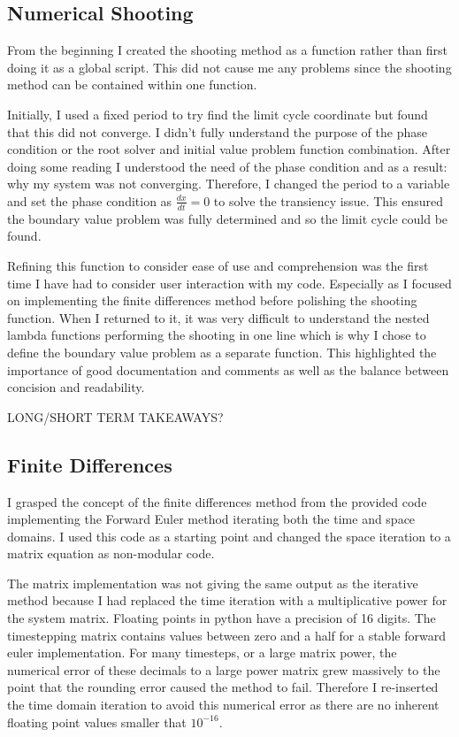\documentclass[10pt]{article}
\begin{document}
\begin{multicols}{2}
\subsection{Numerical Shooting}
From the beginning I created the shooting method as a function rather than first doing it as a global script. This did not cause me any problems since the shooting method can be contained within one function. 

Initially, I used a fixed period to try find the limit cycle coordinate but found that this did not converge. I didn't fully understand the purpose of the phase condition or the root solver and initial value problem function combination. After doing some reading I understood the need of the phase condition and as a result: why my system was not converging. Therefore, I changed the period to a variable and set the phase condition as $\frac{dx}{dt}=0$ to solve the transiency issue. This ensured the boundary value problem was fully determined and so the limit cycle could be found.

Refining this function to consider ease of use and comprehension was the first time I have had to consider user interaction with my code. Especially as I focused on implementing the finite differences method before polishing the shooting function. When I returned to it, it was very difficult to understand the nested lambda functions performing the shooting in one line which is why I chose to define the boundary value problem as a separate function. This highlighted the importance of good documentation and comments as well as the balance between concision and readability.  

LONG/SHORT TERM TAKEAWAYS?


\subsection{Finite Differences}
I grasped the concept of the finite differences method from the provided code implementing the Forward Euler method iterating both the time and space domains. I used this code as a starting point and changed the space iteration to a matrix equation as non-modular code.

The matrix implementation was not giving the same output as the iterative method because I had replaced the time iteration with a multiplicative power for the system matrix. Floating points in python have a precision of 16 digits. The timestepping matrix contains values between zero and a half for a stable forward euler implementation. For many timesteps, or a large matrix power, the numerical error of these decimals to a large power matrix grew massively to the point that the rounding error caused the method to fail. Therefore I re-inserted the time domain iteration to avoid this numerical error as there are no inherent floating point values smaller that $10^{-16}$. 


\end{multicols}
\end{document}
